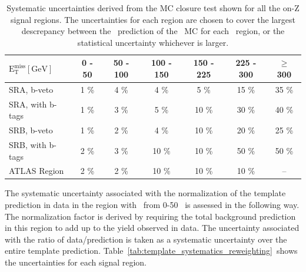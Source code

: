 \begin{table}[htb]
  \scriptsize
  \begin{center}
    \caption{
      \label{tab:template_systematics_overview} 
      Systematic uncertainties derived from the MC closure test shown for all the on-Z signal regions. 
      The uncertainties for each region are chosen to cover the largest descrepancy between the \gjets\ prediction of the \zjets\ MC for each \MET\ region,
      or the statistical uncertainty whichever is larger. 
    }
    \begin{tabular}{l|c|c|c|c|c|c}
      \hline
      \hline
      $\mathrm{E_{T}^{miss} [GeV]}$ &0 - 50 & 50 - 100 & 100 - 150  &150 - 225 & 225 - 300 & $\geq$ 300 \\
      \hline 
      SRA, b-veto         & 1 \%              & 4 \%              &  4 \%  &  5 \%              & 15 \%              & 35 \%   \\
      SRA, with b-tags    & 1 \%              & 3 \%              &  5 \%  & 10 \%              & 30 \%              & 40 \%   \\
      \hline
      SRB, b-veto         & 1 \%              & 2 \%              &  4 \%  & 10 \%              & 20 \%              & 25 \%   \\
      SRB, with b-tags    & 2 \%              & 3 \%              & 10 \%  & 10 \%              & 50 \%              & 50 \%   \\
      \hline
      ATLAS Region & 2 \%              & 2 \%              &  10 \%  & 10 \%              & 10 \%              & --   \\
      \hline
      \hline
    \end{tabular}
  \end{center}
\end{table}

\clearpage

The systematic uncertainty associated with the normalization of the template prediction in data in the region with \MET\ from 0-50 \gev\ is assessed in the following way.
The normalization factor is derived by requiring the total background prediction in this region to add up to the yield observed in data.
The uncertainty associated with the ratio of data/prediction is taken as a systematic uncertainty over the entire template prediction.
Table~\ref{tab:template_systematics_reweighting}~shows the uncertainties for each signal region.

